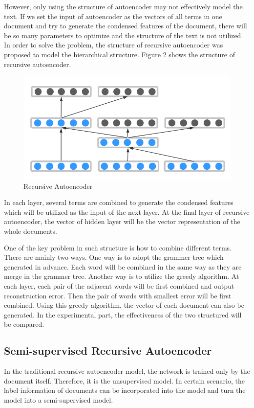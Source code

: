\documentclass[dvips,12pt]{article}
\begin{document}
However, only using the structure of autoencoder may not effectively model the text. If we set the input of autoencoder as the vectors of all terms in one document and try to generate the condensed features of the document, there will be so many parameters to optimize and the structure of the text is not utilized. In order to solve the problem, the structure of recursive autoencoder was proposed to model the hierarchical structure. Figure 2 shows the structure of recursive autoencoder.
\begin{figure}[ht]
\centering
\includegraphics[width = 1.0\linewidth]{figure/recursiveautoencoder}
\caption{Recursive Autoencoder}
\label{fig:rae}
\end{figure}


In each layer, several terms are combined to generate the condensed features which will be utilized as the input of the next layer. At the final layer of recursive autoencoder, the vector of hidden layer will be the vector representation of the whole documents.

One of the key problem in such structure is how to combine different terms. There are mainly two ways. One way is to adopt the grammer tree which generated in advance. Each word will be combined in the same way as they are merge in the grammer tree. Another way is to utilize the greedy algorithm. At each layer, each pair of the adjacent words will be first combined and output reconstruction error. Then the pair of words with smallest error will be first combined. Using this greedy algorithm, the vector of each document can also be generated. In the experimental part, the effectiveness of the two structured will be compared.

\subsection{Semi-supervised Recursive Autoencoder}
In the traditional recursive autoencoder model, the network is trained only by the document itself. Therefore, it is the unsupervised model. In certain scenario, the label information of documents can be incorporated into the model and turn the model into a semi-supervised model.
\end{document}
